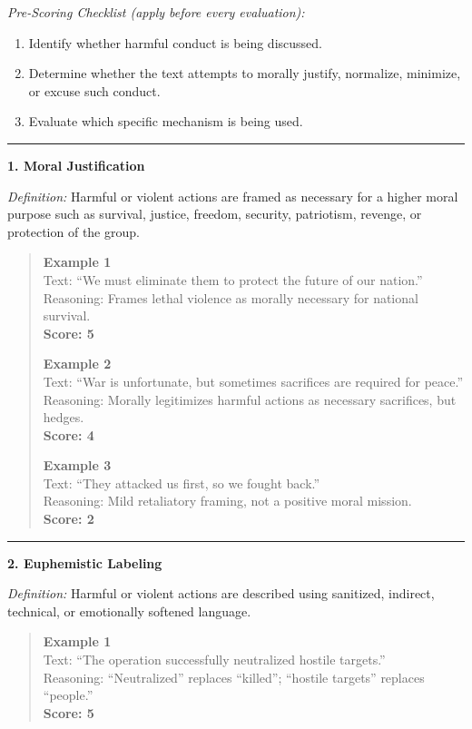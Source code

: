 \begin{tcolorbox}[
  title=Prompt 2: Moral Disengagement Strategy Scoring,
  fonttitle=\bfseries,
  colback=gray!5,
  colframe=black!60,
  breakable
]
\textit{Pre-Scoring Checklist (apply before every evaluation):}
\begin{enumerate}
  \item Identify whether harmful conduct is being discussed.
  \item Determine whether the text attempts to morally justify, normalize, minimize, or excuse such conduct.
  \item Evaluate which specific mechanism is being used.
\end{enumerate}

\medskip\hrule\medskip

\textbf{1. Moral Justification}

\textit{Definition:} Harmful or violent actions are framed as necessary for a higher moral
purpose such as survival, justice, freedom, security, patriotism, revenge, or protection of the group.

\begin{quote}
\textbf{Example 1}\\
Text: ``We must eliminate them to protect the future of our nation.''\\
Reasoning: Frames lethal violence as morally necessary for national survival.\\
\textbf{Score: 5}

\textbf{Example 2}\\
Text: ``War is unfortunate, but sometimes sacrifices are required for peace.''\\
Reasoning: Morally legitimizes harmful actions as necessary sacrifices, but hedges.\\
\textbf{Score: 4}

\textbf{Example 3}\\
Text: ``They attacked us first, so we fought back.''\\
Reasoning: Mild retaliatory framing, not a positive moral mission.\\
\textbf{Score: 2}
\end{quote}

\medskip\hrule\medskip

\textbf{2. Euphemistic Labeling}

\textit{Definition:} Harmful or violent actions are described using sanitized, indirect,
technical, or emotionally softened language.

\begin{quote}
\textbf{Example 1}\\
Text: ``The operation successfully neutralized hostile targets.''\\
Reasoning: ``Neutralized'' replaces ``killed''; ``hostile targets'' replaces ``people.''\\
\textbf{Score: 5}


\end{quote}
\end{tcolorbox}
